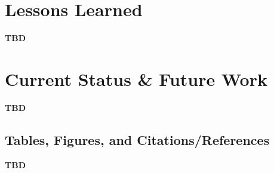 \documentclass{sig-alternate}
\begin{document}
\label{accessing current work}

\section{Lessons Learned}
\label{mistakes}

\textbf{TBD}

\section{Current Status \& Future Work}
\label{current status}

\textbf{TBD}

\subsection{Tables, Figures, and Citations/References}

\textbf{TBD}



\balance
\end{document}
